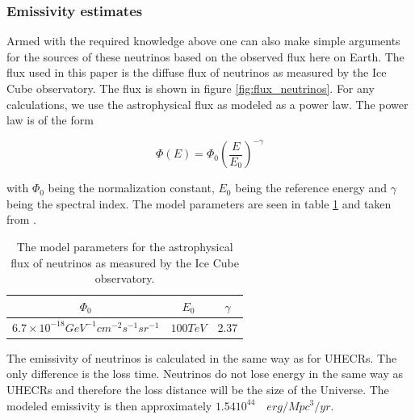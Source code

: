 \subsubsection{Emissivity estimates}
\label{sec:emmisivity_neutrinos}

Armed with the required knowledge above one can also make simple arguments for the sources of these neutrinos based on the observed 
flux here on Earth. The flux used in this paper is the diffuse flux of neutrinos as measured by the Ice Cube observatory. The flux is shown in figure \ref{fig:flux_neutrinos}. 
For any calculations, we use the astrophysical flux as modeled as a power law. The power law is of the form 

\begin{equation}
    \Phi(E) = \Phi_0 \left(\frac{E}{E_0}\right)^{-\gamma}
\end{equation}

with $\Phi_0$ being the normalization constant, $E_0$ being the reference energy and $\gamma$ being the spectral index. The model parameters are seen in table \ref{tab:neutrino_flux} and taken from \cite{Abbasi_2022}.

\begin{table}
    \centering
    \begin{tabular}{|c|c|c|}
        \hline
        $\Phi_0$ & $E_0$ & $\gamma$ \\
        \hline
        $6.7\times 10^{-18} GeV^{-1} cm^{-2} s^{-1} sr^{-1}$ & $100 TeV$ & 2.37 \\
        \hline
    \end{tabular}
    \caption{The model parameters for the astrophysical flux of neutrinos as measured by the Ice Cube observatory.}
    \label{tab:neutrino_flux}
\end{table}

The emissivity of neutrinos is calculated in the same way as for UHECRs. The only difference is the loss time. Neutrinos do not lose energy in the same way as UHECRs and therefore the loss distance will be the size of the Universe. 
The modeled emissivity is then approximately $1.54 10^{44} \quad erg/Mpc^3/yr$. 

